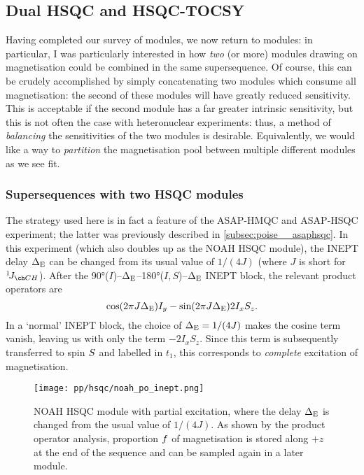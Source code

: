 \subsection{Dual HSQC and HSQC-TOCSY}
\label{subsec:noah__hsqctocsy}

Having completed our survey of \nitrogen{} modules, we now return to \carbon{} modules: in particular, I was particularly interested in how \textit{two} (or more) modules drawing on  magnetisation could be combined in the same supersequence.
Of course, this can be crudely accomplished by simply concatenating two modules which consume all  magnetisation: the second of these modules will have greatly reduced sensitivity.
This is acceptable if the second module has a far greater intrinsic sensitivity, but this is not often the case with heteronuclear experiments: thus, a method of \textit{balancing} the sensitivities of the two modules is desirable.
Equivalently, we would like a way to \textit{partition} the magnetisation pool between multiple different modules as we see fit.


\subsubsection{Supersequences with two HSQC modules}

The strategy used here is in fact a feature of the ASAP-HMQC\autocite{Kupce2007MRC} and ASAP-HSQC experiment\autocite{SchulzeSunninghausen2014JACS,SchulzeSunninghausen2017JMR}; the latter was previously described in \cref{subsec:poise__asaphsqc}.
In this experiment (which also doubles up as the NOAH HSQC module), the INEPT delay $\Delta_{\text{E}}$ can be changed from its usual value of $1 / (4J)$ (where $J$ is short for $\oneJ{CH}$).
After the \ang{90}($I$)--$\Delta_{\text{E}}$--\ang{180}($I,S$)--$\Delta_{\text{E}}$ INEPT block, the relevant product operators are
\begin{equation}
    \label{eq:inept_changed}
    \cos(2\pi J\Delta_{\text{E}}) I_y - \sin(2\pi J\Delta_{\text{E}}) 2I_xS_z.
\end{equation}
In a `normal' INEPT block, the choice of $\Delta_{\text{E}} = 1/(4J)$ makes the cosine term vanish, leaving us with only the term $-2I_xS_z$.
Since this term is subsequently transferred to spin $S\/$ and labelled in $t_1$, this corresponds to \textit{complete} excitation of  magnetisation.

\begin{figure}[!ht]
    \centering
    \texttt{[image: pp/hsqc/noah\_po\_inept.png]}%
    \caption[NOAH HSQC module with partial excitation product operator analysis]{
        NOAH HSQC module with partial excitation, where the delay $\Delta_{\text{E}}$ is changed from the usual value of $1 / (4J)$.
        As shown by the product operator analysis, proportion $f\/$ of  magnetisation is stored along $+z$ at the end of the sequence and can be sampled again in a later module.
    }
    \label{fig:noah_hsqc_deltae_po}
\end{figure}


